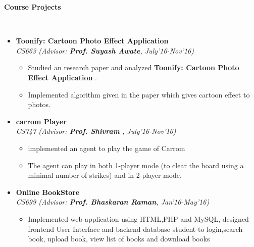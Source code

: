 \documentclass[a4paper,10pt]{article}
\newcommand{\isep}{-2 pt}
\newcommand{\lsep}{-0.5cm}
\newcommand{\resheading}[1]{{\small \colorbox{mygrey}{\begin{minipage}{0.975\textwidth}{\textbf{#1 \vphantom{p\^{E}}}}\end{minipage}}}}
\begin{document}
\resheading{\textbf{\large Course Projects}}\\[\lsep]

\begin{itemize}
\item \textbf{Toonify: Cartoon Photo Effect Application} \\
\emph{	CS663 (Advisor: \textbf{Prof. Suyash Awate}, July'16-Nov'16)}\\[-0.6cm]
      \begin{itemize}\itemsep \isep
	    \item Studied an research paper and analyzed  {\bf Toonify: Cartoon Photo Effect Application} .
		\item Implemented algorithm given in the paper which gives cartoon effect to photos.
      \end{itemize}
\end{itemize}

\begin{itemize}
\item \textbf{carrom  Player} \\
\emph{CS747 (Advisor: \textbf{Prof. Shivram }, July'16-Nov'16)}\\[-0.6cm]
      \begin{itemize}\itemsep \isep
	    \item  implemented an agent to play the game of Carrom
	    \item The agent can play in both 1-player mode (to clear the board using a minimal number of strikes) and in 2-player mode.


      \end{itemize}
\end{itemize}
\begin{itemize}
\item \textbf{Online BookStore} \\
\emph{CS699 (Advisor: \textbf{Prof. Bhaskaran Raman}, Jan'16-May'16)}\\[-0.6cm]
      \begin{itemize}\itemsep \isep
	    \item  Implemented web application using HTML,PHP and MySQL, designed frontend User Interface and backend database
		\itemAllowed student to login,search book, upload book, view list of books and download books	
      \end{itemize}
\end{itemize}





\clearpage
\end{document}

